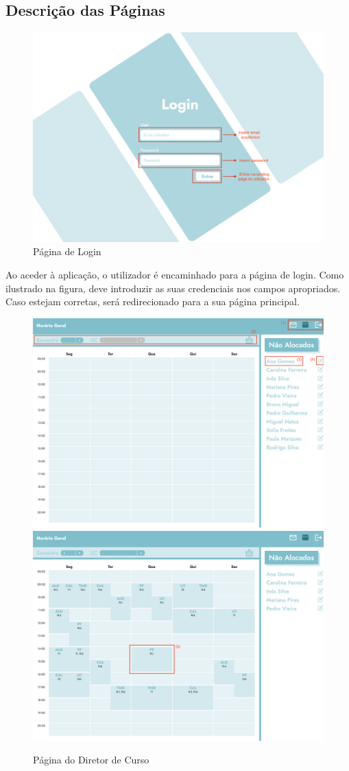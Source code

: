 \documentclass{article}
\begin{document}
\subsection{Descrição das Páginas}
\begin{figure}[H]
    \centering
    \includegraphics[width=0.75\linewidth]{manual/login-page.png}
    \caption{Página de Login}
    \label{fig:enter-label}
\end{figure}
Ao aceder à aplicação, o utilizador é encaminhado para a página de login. Como ilustrado na figura, deve introduzir as suas credenciais nos campos apropriados. Caso estejam corretas, será redirecionado para a sua página principal.
\begin{figure}[H]
    \centering
    \includegraphics[width=0.49\linewidth]{manual/admin-page.png}
    \includegraphics[width=0.49\linewidth]{manual/admin-with-calendar-page.png}
    \caption{Página do Diretor de Curso}
    \label{fig:enter-label}
\end{figure}
\end{document}

